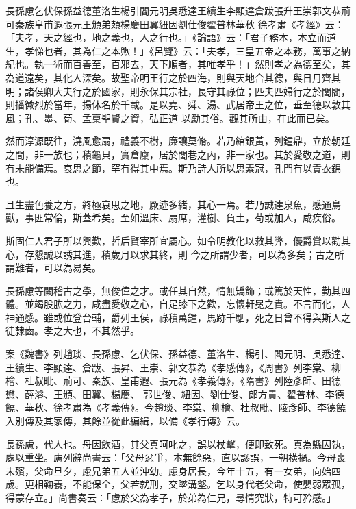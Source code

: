 
\begin{pinyinscope}

 長孫慮乞伏保孫益德董洛生楊引閻元明吳悉達王續生李顯達倉跋張升王崇郭文恭荊可秦族皇甫遐張元王頒弟頍楊慶田翼紐因劉仕俊翟普林華秋
 徐孝肅《孝經》云：「夫孝，天之經也，地之義也，人之行也。」《論語》云：「君子務本，本立而道生，孝悌也者，其為仁之本歟！」《呂覽》云：「夫孝，三皇五帝之本務，萬事之納紀也。執一術而百善至，百邪去，天下順者，其唯孝乎！」然則孝之為德至矣，其為道遠矣，其化人深矣。故聖帝明王行之於四海，則與天地合其德，與日月齊其明；諸侯卿大夫行之於國家，則永保其宗社，長守其祿位；匹夫匹婦行之於閭閻，則播徽烈於當年，揚休名於千載。是以堯、舜、湯、武居帝王之位，垂至德以敦其風；孔、墨、荀、孟稟聖賢之資，弘正道
 以勵其俗。觀其所由，在此而已矣。



 然而淳源既往，澆風愈扇，禮義不樹，廉讓莫脩。若乃綰銀黃，列鐘鼎，立於朝廷之間，非一族也；積龜貝，實倉廩，居於閭巷之內，非一家也。其於愛敬之道，則有未能備焉。哀思之節，罕有得其中焉。斯乃詩人所以思素冠，孔門有以責衣錦也。



 且生盡色養之方，終極哀思之地，厥迹多緒，其心一焉。若乃誠達泉魚，感通鳥獸，事匪常倫，斯蓋希矣。至如溫床、扇席，灌樹、負土，茍或加人，咸疾俗。



 斯固仁人君子所以興歎，哲后賢宰所宜屬心。如令明教化以救其弊，優爵賞以勸其心，存懇誠以誘其進，積歲月以求其終，則
 今之所謂少者，可以為多矣；古之所謂難者，可以為易矣。



 長孫慮等闕稽古之學，無俊偉之才。或任其自然，情無矯飾；或篤於天性，勤其四體。並竭股肱之力，咸盡愛敬之心，自足膝下之歡，忘懷軒冕之貴。不言而化，人神通感。雖或位登台輔，爵列王侯，祿積萬鐘，馬跡千駟，死之日曾不得與斯人之徒隸齒。孝之大也，不其然乎。



 案《魏書》列趙琰、長孫慮、乞伏保、孫益德、董洛生、楊引、閻元明、吳悉達、王續生、李顯達、倉跋、張昇、王崇、郭文恭為《孝感傳》，《周書》列李棠、柳檜、杜叔毗、荊可、秦族、皇甫遐、張元為《孝義傳》，《隋書》列陸彥師、田德懋、薛濬、王頒、田翼、楊慶、
 郭世俊、紐因、劉仕俊、郎方貴、翟普林、李德饒、華秋、徐孝肅為《孝義傳》。今趙琰、李棠、柳檜、杜叔毗、陵彥師、李德饒入別傳及其家傳，其餘並從此編緝，以備《孝行傳》云。



 長孫慮，代人也。母因飲酒，其父真呵叱之，誤以杖擊，便即致死。真為縣囚執，處以重坐。慮列辭尚書云：「父母忿爭，本無餘惡，直以謬誤，一朝橫禍。今母喪未殯，父命旦夕，慮兄弟五人並沖幼。慮身居長，今年十五，有一女弟，向始四歲。更相鞠養，不能保全，父若就刑，交墜溝壑。乞以身代老父命，使嬰弱眾孤，得蒙存立。」尚書奏云：「慮於父為孝子，於弟為仁兄，尋情究狀，特可矜感。」




\end{pinyinscope}
